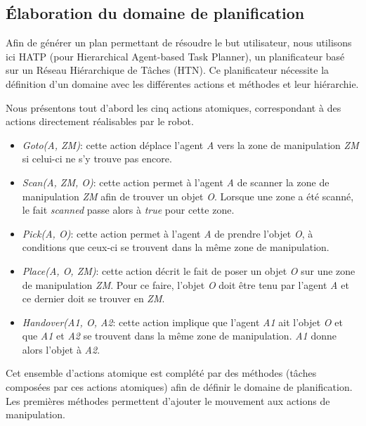 \documentclass[a4paper,11pt,twoside]{StyleThese}
\begin{document}
\subsection{Élaboration du domaine de planification}
\label{sec:domainehatp}

Afin de générer un plan permettant de résoudre le but utilisateur, nous utilisons ici HATP \cite{lallement14} (pour Hierarchical Agent-based Task Planner), un planificateur basé sur un Réseau Hiérarchique de Tâches (HTN).
Ce planificateur nécessite la définition d'un domaine avec les différentes actions et méthodes et leur hiérarchie.

Nous présentons tout d'abord les cinq actions atomiques, correspondant à des actions directement réalisables par le robot.

\begin{itemize}
\item \textit{Goto(A, ZM)}: cette action déplace l'agent \textit{A} vers la zone de manipulation \textit{ZM} si celui-ci ne s'y trouve pas encore.
\item \textit{Scan(A, ZM, O)}: cette action permet à l'agent \textit{A} de scanner la zone de manipulation \textit{ZM} afin de trouver un objet \textit{O}.
Lorsque une zone a été scanné, le fait \textit{scanned} passe alors à \textit{true} pour cette zone.
\item \textit{Pick(A, O)}: cette action permet à l'agent \textit{A} de prendre l'objet \textit{O}, à conditions que ceux-ci se trouvent dans la même zone de manipulation.
\item \textit{Place(A, O, ZM)}: cette action décrit le fait de poser un objet \textit{O} sur une zone de manipulation \textit{ZM}. Pour ce faire, l'objet \textit{O} doit être tenu par l'agent \textit{A} et ce dernier doit se trouver en \textit{ZM}.
\item \textit{Handover(A1, O, A2}: cette action implique que l'agent \textit{A1} ait l'objet \textit{O} et que \textit{A1} et \textit{A2} se trouvent dans la même zone de manipulation. \textit{A1} donne alors l'objet à \textit{A2}.
\end{itemize}
 
 Cet ensemble d'actions atomique est complété par des méthodes (tâches composées par ces actions atomiques) afin de définir le domaine de planification.
 Les premières méthodes permettent d'ajouter le mouvement aux actions de manipulation.
 
\end{document}
